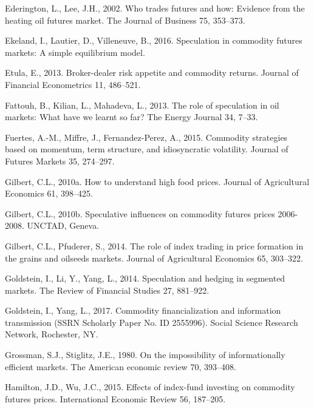 \documentclass[]{elsarticle} %
\begin{document}
\leavevmode\hypertarget{ref-ederington_who_2002}{}%
Ederington, L., Lee, J.H., 2002. Who trades futures and how: Evidence from the heating oil futures market. The Journal of Business 75, 353--373.

\leavevmode\hypertarget{ref-ekeland_speculation_2016}{}%
Ekeland, I., Lautier, D., Villeneuve, B., 2016. Speculation in commodity futures markets: A simple equilibrium model.

\leavevmode\hypertarget{ref-etula_broker-dealer_2013}{}%
Etula, E., 2013. Broker-dealer risk appetite and commodity returns. Journal of Financial Econometrics 11, 486--521.

\leavevmode\hypertarget{ref-fattouh_role_2013}{}%
Fattouh, B., Kilian, L., Mahadeva, L., 2013. The role of speculation in oil markets: What have we learnt so far? The Energy Journal 34, 7--33.

\leavevmode\hypertarget{ref-fuertes_commodity_2015}{}%
Fuertes, A.-M., Miffre, J., Fernandez-Perez, A., 2015. Commodity strategies based on momentum, term structure, and idiosyncratic volatility. Journal of Futures Markets 35, 274--297.

\leavevmode\hypertarget{ref-gilbert_how_2010}{}%
Gilbert, C.L., 2010a. How to understand high food prices. Journal of Agricultural Economics 61, 398--425.

\leavevmode\hypertarget{ref-gilbert_speculative_2010}{}%
Gilbert, C.L., 2010b. Speculative influences on commodity futures prices 2006-2008. UNCTAD, Geneva.

\leavevmode\hypertarget{ref-gilbert_role_2014}{}%
Gilbert, C.L., Pfuderer, S., 2014. The role of index trading in price formation in the grains and oilseeds markets. Journal of Agricultural Economics 65, 303--322.

\leavevmode\hypertarget{ref-goldstein_speculation_2014}{}%
Goldstein, I., Li, Y., Yang, L., 2014. Speculation and hedging in segmented markets. The Review of Financial Studies 27, 881--922.

\leavevmode\hypertarget{ref-goldstein_commodity_2017}{}%
Goldstein, I., Yang, L., 2017. Commodity financialization and information transmission (SSRN Scholarly Paper No. ID 2555996). Social Science Research Network, Rochester, NY.

\leavevmode\hypertarget{ref-grossman_impossibility_1980}{}%
Grossman, S.J., Stiglitz, J.E., 1980. On the impossibility of informationally efficient markets. The American economic review 70, 393--408.

\leavevmode\hypertarget{ref-hamilton_effects_2015}{}%
Hamilton, J.D., Wu, J.C., 2015. Effects of index-fund investing on commodity futures prices. International Economic Review 56, 187--205.
\end{document}
